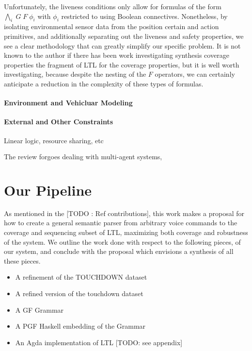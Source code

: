 \documentclass{article}
\begin{document}
Unfortunately, the liveness conditions only allow for formulas of the form
$\underset{i}{\bigwedge}\;G\; F\; \phi_i$ with $\phi_i$ restricted to using
Boolean connectives. Nonetheless, by isolating environmental sensor data from
the position certain and action primitives, and additionally separating out the liveness
and safety properties, we see a clear methodology that can greatly simplify our
specific problem. It is not known to the author if there has been work
investigating synthesis coverage properties the fragment of LTL for the coverage
properties, but it is well worth investigating, because despite the nesting of
the $F$ operators, we can certainly anticipate a reduction in the complexity of
these types of formulas.




\paragraph{Environment and Vehicluar Modeling}

\paragraph{External and Other Constraints}

Linear logic, resource sharing, etc

The review \cite{synthGazit} forgoes dealing with multi-agent systems,

\section{Our Pipeline}

As mentioned in the [TODO : Ref contributions], this work makes a proposal for
how to create a general semantic parser from arbitrary voice commands to the
coverage and sequencing subset of LTL, maximizing both coverage and robustness
of the system. We outline the work done with respect to the following pieces, of
our system, and conclude with the proposal which envisions a synthesis of all
these pieces.

\begin{itemize}[noitemsep]
\item A refinement of the TOUCHDOWN dataset \cite{chen2019touchdown}
\item A refined version of the touchdown dataset
\item A GF Grammar
\item A PGF Haskell embedding of the Grammar
\item An Agda implementation of LTL [TODO: see appendix]
\end{itemize}
\end{document}
